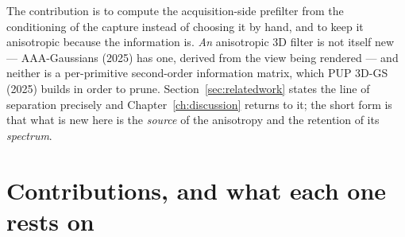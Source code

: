The contribution is to compute the acquisition-side prefilter from the conditioning of the capture instead of choosing it by hand, and to keep it anisotropic
because the information is. \emph{An} anisotropic 3D filter is not itself new
--- AAA-Gaussians (2025) has one, derived from the view being rendered --- and
neither is a per-primitive second-order information matrix, which PUP 3D-GS
(2025) builds in order to prune. Section~\ref{sec:relatedwork} states the line of
separation precisely and Chapter~\ref{ch:discussion} returns to it; the short
form is that what is new here is the \emph{source} of the anisotropy and the
retention of its \emph{spectrum}.

\section{Contributions, and what each one rests on}

